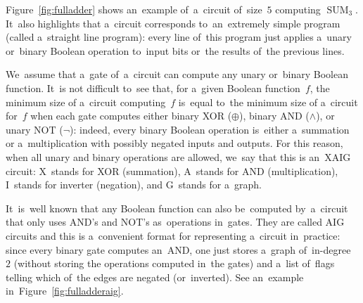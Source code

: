 \documentclass[sigconf, review, anonymous]{acmart}
\begin{document}
Figure~\ref{fig:fulladder} shows an~example of~a~circuit of~size~$5$ computing
$\operatorname{SUM}_3$. It~also highlights that a~circuit corresponds
to~an~extremely simple program (called a~straight line program):
every line of~this program just applies a~unary or~binary Boolean operation
to~input bits or~the results of~the previous lines.

We~assume that a~gate of~a~circuit can compute any unary or~binary Boolean function.
It~is not difficult to~see that, for a~given Boolean function~$f$,
the minimum size of a~circuit computing~$f$ is~equal
to~the minimum size of a~circuit for~$f$
when each gate computes either
binary XOR ($\oplus$), binary AND ($\land$), or unary NOT ($\neg$):
indeed, every binary Boolean operation is~either a~summation
or a~multiplication with possibly negated inputs and outputs. For this reason,
when all unary and binary operations are allowed, we~say that this is an~XAIG circuit:
X~stands for XOR (summation),
A~stands for AND (multiplication),
I~stands for inverter (negation),
and G~stands for a~graph.

It~is~well known that any Boolean function can also be~computed
by~a~circuit that only uses AND's and NOT's as~operations in~gates.
They are called AIG circuits \cite{BiereHeljankoWieringa2011} and this is a~convenient format for representing
a~circuit in~practice: since every binary gate computes an~AND, one just stores
a~graph of~in-degree~$2$ (without storing the operations computed in~the gates)
and a~list of~flags telling which of~the edges are negated (or~inverted).
See an~example in~Figure~\ref{fig:fulladderaig}.
\end{document}
